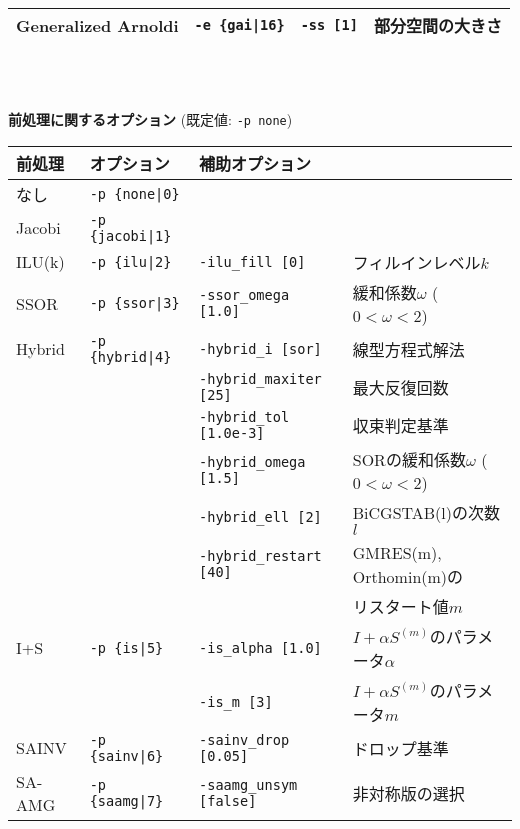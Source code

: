 \documentclass[a4paper]{jarticle}
\begin{document}
{{\begin{minipage}[t]{\textwidth}
\begin{center}
\begin{tabular}{l|lll}
 Generalized Arnoldi    & \verb=-e {gai|16}=       &    \verb=-ss [1]= & 部分空間の大きさ \\ 
\hline         
\end{tabular}
\end{center}
\end{minipage}
\\ \\
\begin{minipage}[t]{\textwidth}
\begin{center}
{\bf 前処理に関するオプション} (既定値: \verb=-p none=) \\
\begin{tabular}{l|lll}\hline\hline
前処理   & オプション           & 補助オプション \\ \hline
なし     & \verb=-p {none|0}=    &   \\
Jacobi   & \verb=-p {jacobi|1}=  &     \\
ILU(k)   & \verb=-p {ilu|2}=     & \verb=-ilu_fill [0]=    & フィルインレベル$k$ \\
SSOR     & \verb=-p {ssor|3}=    & \verb=-ssor_omega [1.0]=    & 緩和係数$\omega$ ($0<\omega<2$) \\
Hybrid   & \verb=-p {hybrid|4}=  & \verb=-hybrid_i [sor]=  & 線型方程式解法 \\
         &                       & \verb=-hybrid_maxiter [25]= & 最大反復回数 \\
         &                       & \verb=-hybrid_tol [1.0e-3]= & 収束判定基準 \\
         &                       & \verb=-hybrid_omega [1.5]=  & SORの緩和係数$\omega$ ($0<\omega<2$) \\
         &                       & \verb=-hybrid_ell [2]=      & BiCGSTAB(l)の次数$l$\\
         &                       & \verb=-hybrid_restart [40]= & GMRES(m), Orthomin(m)の \\
         &                       &                             & リスタート値$m$ \\
I+S      & \verb=-p {is|5}=      & \verb=-is_alpha [1.0]=  & $I+\alpha S^{(m)}$のパラメータ$\alpha$ \\
         &                       & \verb=-is_m [3]=        & $I+\alpha S^{(m)}$のパラメータ$m$ \\
SAINV    & \verb=-p {sainv|6}=   & \verb=-sainv_drop [0.05]=    & ドロップ基準\\
SA-AMG   & \verb=-p {saamg|7}=   & \verb=-saamg_unsym [false]=     & 非対称版の選択 \\

\end{tabular}
\end{center}
\end{minipage}}}
\end{document}
